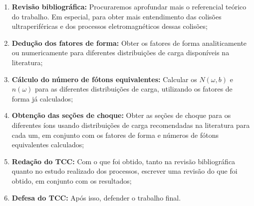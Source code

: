 \begin{enumerate}
	\item \textbf{Revisão bibliográfica:} Procuraremos aprofundar mais o
referencial teórico do trabalho. Em especial, para obter mais entendimento das
colisões ultraperiféricas e dos processos eletromagnéticos dessas colisões;
	\item \textbf{Dedução dos fatores de forma:} Obter os fatores de forma
analiticamente ou numericamente para diferentes distribuições de carga
disponíveis na literatura;
	\item \textbf{Cálculo do número de fótons equivalentes:} Calcular os
$N(\omega , b)$ e $n(\omega)$ para as diferentes distribuições de carga,
utilizando os fatores de forma já calculados;
	\item \textbf{Obtenção das seções de choque:} Obter as seções de choque
para os diferentes íons usando distribuições de carga recomendadas na
literatura para cada um, em conjunto com os fatores de forma e números de fótons
equivalentes calculados;
	\item \textbf{Redação do TCC:} Com o que foi obtido, tanto na revisão
bibliográfica quanto no estudo realizado dos processos, escrever uma revisão
do que foi obtido, em conjunto com os resultados;
	\item \textbf{Defesa do TCC:} Após isso, defender o trabalho final.
\end{enumerate}

